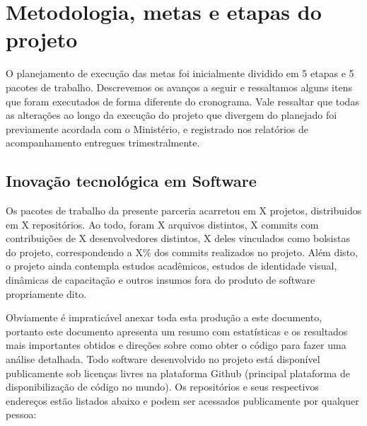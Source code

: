 \hypertarget{metodologia-metas-e-etapas-do-projeto}{%
\section{Metodologia, metas e etapas do
projeto}\label{metodologia-metas-e-etapas-do-projeto}}

O planejamento de execução das metas foi inicialmente dividido em 5
etapas e 5 pacotes de trabalho. Descrevemos os avanços a seguir e
ressaltamos alguns itens que foram executados de forma diferente do
cronograma. Vale ressaltar que todas as alterações ao longo da execução
do projeto que divergem do planejado foi previamente acordada com o
Ministério, e registrado nos relatórios de acompanhamento entregues
trimestralmente.

\hypertarget{inovauxe7uxe3o-tecnoluxf3gica-em-software}{%
\subsection{Inovação tecnológica em
Software}\label{inovauxe7uxe3o-tecnoluxf3gica-em-software}}

Os pacotes de trabalho da presente parceria acarretou em X projetos,
distribuidos em X repositórios. Ao todo, foram X arquivos distintos, X
commits com contribuições de X desenvolvedores distintos, X deles
vinculados como bolsistas do projeto, correspondendo a X\% dos commits
realizados no projeto. Além disto, o projeto ainda contempla estudos
acadêmicos, estudos de identidade visual, dinâmicas de capacitação e
outros insumos fora do produto de software propriamente dito.

Obviamente é impraticável anexar toda esta produção a este documento,
portanto este documento apresenta um resumo com estatísticas e os
resultados mais importantes obtidos e direções sobre como obter o código
para fazer uma análise detalhada. Todo software desenvolvido no projeto
está disponível publicamente sob licenças livres na plataforma Github
(principal plataforma de disponibilização de código no mundo). Os
repositórios e seus respectivos endereços estão listados abaixo e podem
ser acessados publicamente por qualquer pessoa:

